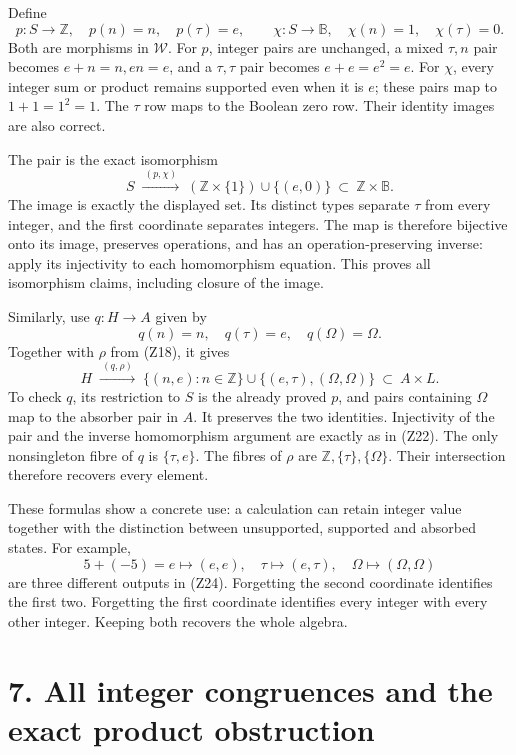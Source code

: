 \documentclass[
]{article}
\begin{document}
Define \[
p:S\to\mathbb Z,\quad p(n)=n,\quad p(\tau)=e,
\qquad
\chi:S\to\mathbb B,\quad\chi(n)=1,\quad\chi(\tau)=0.
\tag{Z21}
\] Both are morphisms in \(\mathcal W\). For \(p\), integer pairs are
unchanged, a mixed \(\tau,n\) pair becomes \(e+n=n,en=e\), and a
\(\tau,\tau\) pair becomes \(e+e=e^2=e\). For \(\chi\), every integer
sum or product remains supported even when it is \(e\); these pairs map
to \(1+1=1^2=1\). The \(\tau\) row maps to the Boolean zero row. Their
identity images are also correct.

The pair is the exact isomorphism \[
S\;\xrightarrow{\ (p,\chi)\ }\;
(\mathbb Z\times\{1\})\cup\{(e,0)\}
\ \subset\ \mathbb Z\times\mathbb B.
\tag{Z22}
\] The image is exactly the displayed set. Its distinct types separate
\(\tau\) from every integer, and the first coordinate separates
integers. The map is therefore bijective onto its image, preserves
operations, and has an operation-preserving inverse: apply its
injectivity to each homomorphism equation. This proves all isomorphism
claims, including closure of the image.

Similarly, use \(q:H\to A\) given by \[
q(n)=n,\quad q(\tau)=e,\quad q(\Omega)=\Omega.
\tag{Z23}
\] Together with \(\rho\) from (Z18), it gives \[
H\;\xrightarrow{\ (q,\rho)\ }\;
\{(n,e):n\in\mathbb Z\}\cup\{(e,\tau),(\Omega,\Omega)\}
\ \subset\ A\times L.
\tag{Z24}
\] To check \(q\), its restriction to \(S\) is the already proved \(p\),
and pairs containing \(\Omega\) map to the absorber pair in \(A\). It
preserves the two identities. Injectivity of the pair and the inverse
homomorphism argument are exactly as in (Z22). The only nonsingleton
fibre of \(q\) is \(\{\tau,e\}\). The fibres of \(\rho\) are
\(\mathbb Z,\{\tau\},\{\Omega\}\). Their intersection therefore recovers
every element.

These formulas show a concrete use: a calculation can retain integer
value together with the distinction between unsupported, supported and
absorbed states. For example, \[
5+(-5)=e\longmapsto(e,e),\quad
\tau\longmapsto(e,\tau),\quad
\Omega\longmapsto(\Omega,\Omega)
\tag{Z25}
\] are three different outputs in (Z24). Forgetting the second
coordinate identifies the first two. Forgetting the first coordinate
identifies every integer with every other integer. Keeping both recovers
the whole algebra.

\section{7. All integer congruences and the exact product
obstruction}\label{all-integer-congruences-and-the-exact-product-obstruction}
\end{document}
